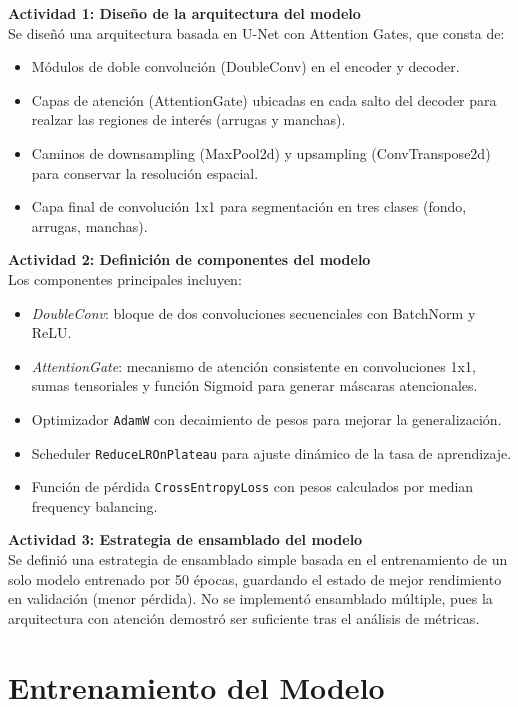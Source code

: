 \textbf{Actividad 1: Diseño de la arquitectura del modelo}\\
Se diseñó una arquitectura basada en U-Net con Attention Gates, que consta de:
\begin{itemize}
  \item Módulos de doble convolución (DoubleConv) en el encoder y decoder.  
  \item Capas de atención (AttentionGate) ubicadas en cada salto del decoder para realzar las regiones de interés (arrugas y manchas).  
  \item Caminos de downsampling (MaxPool2d) y upsampling (ConvTranspose2d) para conservar la resolución espacial.  
  \item Capa final de convolución 1x1 para segmentación en tres clases (fondo, arrugas, manchas).  
\end{itemize}

\textbf{Actividad 2: Definición de componentes del modelo}\\
Los componentes principales incluyen:
\begin{itemize}
  \item \textit{DoubleConv}: bloque de dos convoluciones secuenciales con BatchNorm y ReLU.  
  \item \textit{AttentionGate}: mecanismo de atención consistente en convoluciones 1x1, sumas tensoriales y función Sigmoid para generar máscaras atencionales.  
  \item Optimizador \texttt{AdamW} con decaimiento de pesos para mejorar la generalización.  
  \item Scheduler \texttt{ReduceLROnPlateau} para ajuste dinámico de la tasa de aprendizaje.  
  \item Función de pérdida \texttt{CrossEntropyLoss} con pesos calculados por median frequency balancing.  
\end{itemize}

\textbf{Actividad 3: Estrategia de ensamblado del modelo}\\
Se definió una estrategia de ensamblado simple basada en el entrenamiento de un solo modelo entrenado por 50 épocas, guardando el estado de mejor rendimiento en validación (menor pérdida). No se implementó ensamblado múltiple, pues la arquitectura con atención demostró ser suficiente tras el análisis de métricas.

\section{Entrenamiento del Modelo}

